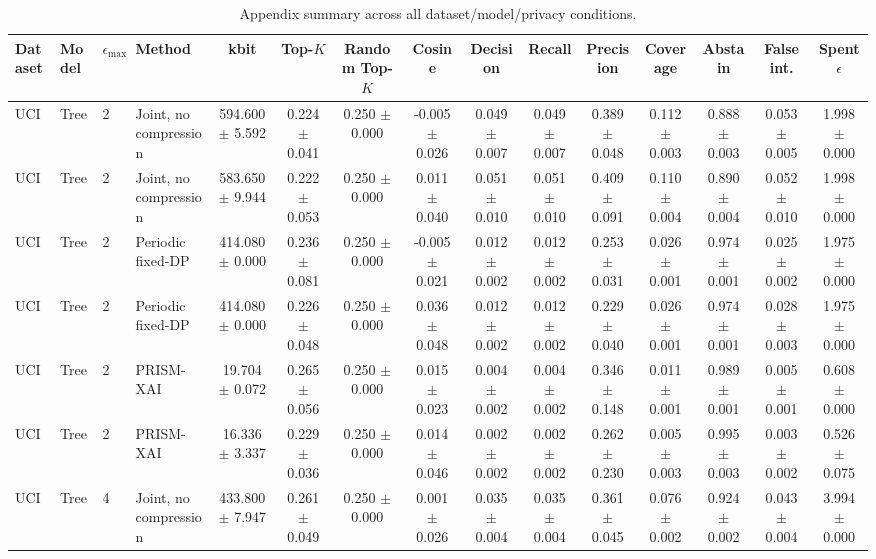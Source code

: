 \begin{table}[t]
\caption{Appendix summary across all dataset/model/privacy conditions.}
\label{tab:appendix-conditions}
\centering
\scriptsize
\setlength{\tabcolsep}{2.5pt}
\begin{tabular}{llllccccccccccc}
\toprule
Dataset & Model & $\epsilon_{\max}$ & Method & kbit & Top-$K$ & Random Top-$K$ & Cosine & Decision & Recall & Precision & Coverage & Abstain & False int. & Spent $\epsilon$ \\
\midrule
UCI & Tree & 2 & Joint, no compression & 594.600 $\pm$ 5.592 & 0.224 $\pm$ 0.041 & 0.250 $\pm$ 0.000 & -0.005 $\pm$ 0.026 & 0.049 $\pm$ 0.007 & 0.049 $\pm$ 0.007 & 0.389 $\pm$ 0.048 & 0.112 $\pm$ 0.003 & 0.888 $\pm$ 0.003 & 0.053 $\pm$ 0.005 & 1.998 $\pm$ 0.000 \\
UCI & Tree & 2 & Joint, no compression & 583.650 $\pm$ 9.944 & 0.222 $\pm$ 0.053 & 0.250 $\pm$ 0.000 & 0.011 $\pm$ 0.040 & 0.051 $\pm$ 0.010 & 0.051 $\pm$ 0.010 & 0.409 $\pm$ 0.091 & 0.110 $\pm$ 0.004 & 0.890 $\pm$ 0.004 & 0.052 $\pm$ 0.010 & 1.998 $\pm$ 0.000 \\
UCI & Tree & 2 & Periodic fixed-DP & 414.080 $\pm$ 0.000 & 0.236 $\pm$ 0.081 & 0.250 $\pm$ 0.000 & -0.005 $\pm$ 0.021 & 0.012 $\pm$ 0.002 & 0.012 $\pm$ 0.002 & 0.253 $\pm$ 0.031 & 0.026 $\pm$ 0.001 & 0.974 $\pm$ 0.001 & 0.025 $\pm$ 0.002 & 1.975 $\pm$ 0.000 \\
UCI & Tree & 2 & Periodic fixed-DP & 414.080 $\pm$ 0.000 & 0.226 $\pm$ 0.048 & 0.250 $\pm$ 0.000 & 0.036 $\pm$ 0.048 & 0.012 $\pm$ 0.002 & 0.012 $\pm$ 0.002 & 0.229 $\pm$ 0.040 & 0.026 $\pm$ 0.001 & 0.974 $\pm$ 0.001 & 0.028 $\pm$ 0.003 & 1.975 $\pm$ 0.000 \\
UCI & Tree & 2 & PRISM-XAI & 19.704 $\pm$ 0.072 & 0.265 $\pm$ 0.056 & 0.250 $\pm$ 0.000 & 0.015 $\pm$ 0.023 & 0.004 $\pm$ 0.002 & 0.004 $\pm$ 0.002 & 0.346 $\pm$ 0.148 & 0.011 $\pm$ 0.001 & 0.989 $\pm$ 0.001 & 0.005 $\pm$ 0.001 & 0.608 $\pm$ 0.000 \\
UCI & Tree & 2 & PRISM-XAI & 16.336 $\pm$ 3.337 & 0.229 $\pm$ 0.036 & 0.250 $\pm$ 0.000 & 0.014 $\pm$ 0.046 & 0.002 $\pm$ 0.002 & 0.002 $\pm$ 0.002 & 0.262 $\pm$ 0.230 & 0.005 $\pm$ 0.003 & 0.995 $\pm$ 0.003 & 0.003 $\pm$ 0.002 & 0.526 $\pm$ 0.075 \\
UCI & Tree & 4 & Joint, no compression & 433.800 $\pm$ 7.947 & 0.261 $\pm$ 0.049 & 0.250 $\pm$ 0.000 & 0.001 $\pm$ 0.026 & 0.035 $\pm$ 0.004 & 0.035 $\pm$ 0.004 & 0.361 $\pm$ 0.045 & 0.076 $\pm$ 0.002 & 0.924 $\pm$ 0.002 & 0.043 $\pm$ 0.004 & 3.994 $\pm$ 0.000 \\

\end{tabular}
\end{table}
